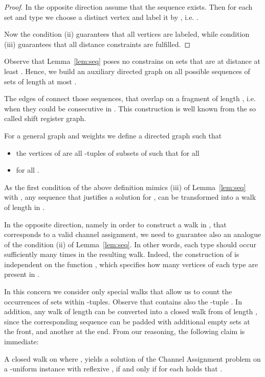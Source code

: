 \documentclass[a4paper,UKenglish]{lipics}
\theoremstyle{plain}
\theoremstyle{definition}
\begin{document}
{\begin{proof}
In the opposite direction assume that the sequence  exists. Then for each set  and type  we choose a
distinct vertex  and label it by , i.e. .

Now the condition (ii) guarantees that all vertices are labeled, while condition (iii) guarantees that all distance constraints are fulfilled.
\end{proof}

Observe that Lemma~\ref{lem:seq} poses no constrains on sets  that are at distance at least . Hence, we build an auxiliary directed graph  on all possible sequences of sets of length at most .

The edges of  connect those sequences, that overlap on a fragment of length , i.e. when they could be consecutive in .
This construction is well known from the so called shift register graph.

\begin{definition}
For a general graph  and weights  we define a directed graph  such that 
\begin{itemize}
\item the vertices of  are all -tuples  of subsets of  such that for all 
\item  for all .
\end{itemize}
\end{definition}

As the first condition of the above definition mimics (iii) of Lemma~\ref{lem:seq} with , 
any sequence  that justifies a solution for , 
can be transformed into a walk of length  in . 

In the opposite direction, namely in order to construct a walk in , that corresponds to a valid channel assignment, we need to guarantee also an analogue of the condition (ii) of Lemma~\ref{lem:seq}. 
In other words, each type should occur sufficiently many times in the resulting walk.
Indeed, the construction of  is independent on the function , 
which specifies how many vertices of each type are present in .

In this concern we consider only special walks that allow us to count the occurrences of sets within -tuples.
Observe that  contains also the -tuple . In addition, any 
walk of length  can be converted into a closed walk from  of length , 
since the corresponding sequence  can be padded with additional  empty sets at the front, and another  at the end. From our reasoning, the following claim is immediate:

\begin{lemma}\label{lem:walk}
A closed walk  on  where ,
yields a solution of the {\sc Channel Assignment} problem 
on a -uniform instance  with reflexive , 
if and only if for each  holds that  .
\end{lemma}

}
\end{document}
